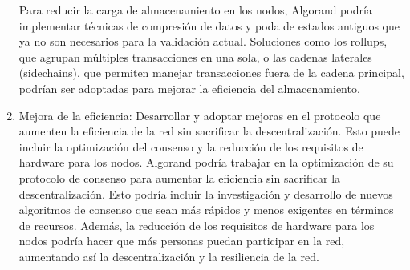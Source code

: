 \documentclass{article}
\begin{document}
\begin{enumerate}
    Para reducir la carga de almacenamiento en los nodos, Algorand podría implementar técnicas de compresión de datos y poda de estados antiguos que ya no son necesarios para la validación actual. Soluciones como los rollups, que agrupan múltiples transacciones en una sola, o las cadenas laterales (sidechains), que permiten manejar transacciones fuera de la cadena principal, podrían ser adoptadas para mejorar la eficiencia del almacenamiento.
    \item Mejora de la eficiencia: Desarrollar y adoptar mejoras en el protocolo que aumenten la eficiencia de la red sin sacrificar la descentralización. Esto puede incluir la optimización del consenso y la reducción de los requisitos de hardware para los nodos.
    Algorand podría trabajar en la optimización de su protocolo de consenso para aumentar la eficiencia sin sacrificar la descentralización. Esto podría incluir la investigación y desarrollo de nuevos algoritmos de consenso que sean más rápidos y menos exigentes en términos de recursos. Además, la reducción de los requisitos de hardware para los nodos podría hacer que más personas puedan participar en la red, aumentando así la descentralización y la resiliencia de la red.
\end{enumerate}
\end{document}
